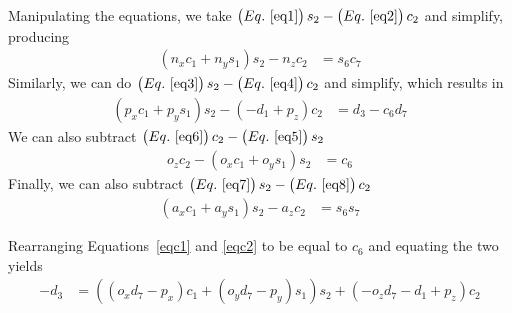\documentclass[onecolumn,10pt]{jhwhw}
\begin{document}
Manipulating the equations, we take $\left(Eq.~\ref{eq1} \right) s_2 - \left(Eq.~\ref{eq2} \right) c_2$ and simplify, producing
\begin{align}
\left(n_{x} c_1 + n_{y} s_1\right) s_2 - n_{z} c_2 &= s_{6} c_{7} \label{eqc3}
\end{align}
Similarly, we can do $\left(Eq.~\ref{eq3} \right) s_2-\left(Eq.~\ref{eq4}\right) c_2$ and simplify, which results in
\begin{align}
\left(p_{x} c_1 + p_{y} s_1 \right) s_2 - \left(- d_{1} + p_{z} \right) c_2 &= d_3 - c_6 d_7 \label{eqc1}
\end{align}
We can also subtract $\left(Eq.~\ref{eq6} \right) c_2 - \left(Eq.~\ref{eq5} \right) s_2$
\begin{align}
o_{z} c_2 - \left( o_{x} c_1 + o_{y} s_1 \right) s_2 &= c_{6} \label{eqc2}
\end{align}
Finally, we can also subtract $\left(Eq.~\ref{eq7} \right) s_2 - \left(Eq.~\ref{eq8} \right) c_2$
\begin{align}
\left(a_{x} c_1 + a_{y} s_1\right) s_2 - a_{z} c_2 &= s_{6} s_{7} \label{eqc4}
\end{align}

Rearranging Equations~\ref{eqc1} and \ref{eqc2} to be equal to $c_6$ and equating the two yields
\begin{align}
-d_3 &= \left( \left( o_{x} d_7 - p_{x} \right) c_1 + \left( o_{y} d_7 - p_{y} \right) s_1 \right) s_2 + \left(-o_{z} d_7 - d_{1} + p_{z} \right) c_2 
\end{align}
\end{document}
